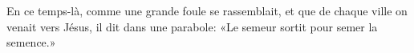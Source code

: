 En ce temps-là, comme une grande foule se rassemblait,
	et que de chaque ville on venait vers Jésus, il dit dans une parabole:
	«Le semeur sortit pour semer la semence.»
